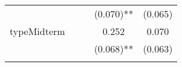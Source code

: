 \documentclass[12pt,twoside]{reedthesis}
\begin{document}
\begin{longtable}[]{@{}lcccc@{}}
  \begin{minipage}[t]{0.23\columnwidth}\raggedright\strut
  \strut
  \end{minipage} & \begin{minipage}[t]{0.14\columnwidth}\centering\strut
  \strut
  \end{minipage} & \begin{minipage}[t]{0.18\columnwidth}\centering\strut
  \strut
  \end{minipage} & \begin{minipage}[t]{0.20\columnwidth}\centering\strut
  (0.070)**\strut
  \end{minipage} & \begin{minipage}[t]{0.11\columnwidth}\centering\strut
  (0.065)\strut
  \end{minipage}\tabularnewline
  \begin{minipage}[t]{0.23\columnwidth}\raggedright\strut
  typeMidterm\strut
  \end{minipage} & \begin{minipage}[t]{0.14\columnwidth}\centering\strut
  \strut
  \end{minipage} & \begin{minipage}[t]{0.18\columnwidth}\centering\strut
  \strut
  \end{minipage} & \begin{minipage}[t]{0.20\columnwidth}\centering\strut
  0.252\strut
  \end{minipage} & \begin{minipage}[t]{0.11\columnwidth}\centering\strut
  0.070\strut
  \end{minipage}\tabularnewline
  \begin{minipage}[t]{0.23\columnwidth}\raggedright\strut
  \strut
  \end{minipage} & \begin{minipage}[t]{0.14\columnwidth}\centering\strut
  \strut
  \end{minipage} & \begin{minipage}[t]{0.18\columnwidth}\centering\strut
  \strut
  \end{minipage} & \begin{minipage}[t]{0.20\columnwidth}\centering\strut
  (0.068)**\strut
  \end{minipage} & \begin{minipage}[t]{0.11\columnwidth}\centering\strut
  (0.063)\strut
  \end{minipage}\tabularnewline
  \begin{minipage}[t]{0.23\columnwidth}\raggedright\strut

\end{minipage}
\end{longtable}
\end{document}
